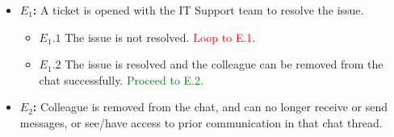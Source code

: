 \documentclass[]{article}
\begin{document}
\begin{enumerate}[\bf {BE}8.]
{{\begin{itemize}
                    \item {\bf $E_{1}$:}  A ticket is opened with the IT Support team to resolve the issue.
                        \begin{itemize}
                            \item {\bf $E_{1}.1$} The issue is not resolved. \textcolor{red}{Loop to E.1}.
                            \item {\bf $E_{1}.2$} The issue is resolved and the colleague can be removed from the chat successfully. \textcolor{green}{Proceed to E.2}.
                        \end{itemize}
                        
					\item {\bf $E_{2}$:}  Colleague is removed from the chat, and can no longer receive or send messages, or see/have access to prior communication in that chat thread.
                            
			\end{itemize}
			}%
		}%
		\end{enumerate}
\end{document}
